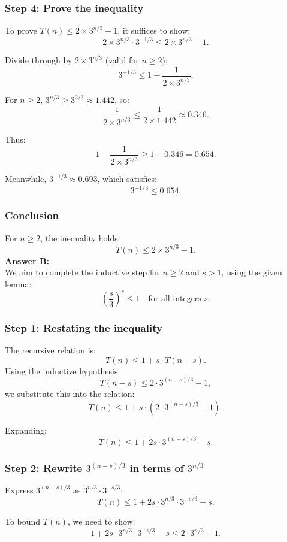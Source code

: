 \documentclass[12pt]{article}
\begin{document}
\subsubsection*{Step 4: Prove the inequality}
To prove \( T(n) \leq 2 \times 3^{n/3} - 1 \), it suffices to show:
\[
2 \times 3^{n/3} \cdot 3^{-1/3} \leq 2 \times 3^{n/3} - 1.
\]

Divide through by \( 2 \times 3^{n/3} \) (valid for \( n \geq 2 \)):
\[
3^{-1/3} \leq 1 - \frac{1}{2 \times 3^{n/3}}.
\]

For \( n \geq 2 \), \( 3^{n/3} \geq 3^{2/3} \approx 1.442 \), so:
\[
\frac{1}{2 \times 3^{n/3}} \leq \frac{1}{2 \times 1.442} \approx 0.346.
\]

Thus:
\[
1 - \frac{1}{2 \times 3^{n/3}} \geq 1 - 0.346 = 0.654.
\]

Meanwhile, \( 3^{-1/3} \approx 0.693 \), which satisfies:
\[
3^{-1/3} \leq 0.654.
\]

\subsubsection*{Conclusion}
For \( n \geq 2 \), the inequality holds:
\[
T(n) \leq 2 \times 3^{n/3} - 1.
\]
\textbf{Answer B: }\\
We aim to complete the inductive step for \( n \geq 2 \) and \( s > 1 \), using the given lemma:
\[
\left( \frac{s}{3} \right)^s \leq 1 \quad \text{for all integers } s.
\]

\subsubsection*{Step 1: Restating the inequality}
The recursive relation is:
\[
T(n) \leq 1 + s \cdot T(n-s).
\]
Using the inductive hypothesis:
\[
T(n-s) \leq 2 \cdot 3^{(n-s)/3} - 1,
\]
we substitute this into the relation:
\[
T(n) \leq 1 + s \cdot (2 \cdot 3^{(n-s)/3} - 1).
\]

Expanding:
\[
T(n) \leq 1 + 2s \cdot 3^{(n-s)/3} - s.
\]

\subsubsection*{Step 2: Rewrite \( 3^{(n-s)/3} \) in terms of \( 3^{n/3} \)}
Express \( 3^{(n-s)/3} \) as \( 3^{n/3} \cdot 3^{-s/3} \):
\[
T(n) \leq 1 + 2s \cdot 3^{n/3} \cdot 3^{-s/3} - s.
\]

To bound \( T(n) \), we need to show:
\[
1 + 2s \cdot 3^{n/3} \cdot 3^{-s/3} - s \leq 2 \cdot 3^{n/3} - 1.
\]
\end{document}

